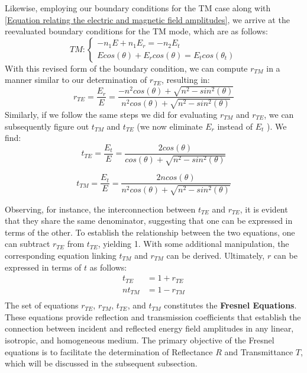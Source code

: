 Likewise, employing our boundary conditions for the TM case along with \ref{Equation relating the electric and magnetic field amplitudes}, we arrive at the reevaluated boundary conditions for the TM mode, which are as follows:
\begin{equation}
TM:
\begin{cases} \label{TM boundary conditions}
  -n_1E + n_1E_r = -n_2E_t \\
  Ecos(\theta) + E_rcos(\theta) = E_tcos(\theta_t)
\end{cases}
\end{equation}
With this revised form of the boundary condition, we can compute $r_{TM}$ in a manner similar to our determination of $r_{TE}$, resulting in:
\begin{equation} \label{Reflection coefficient (TM) without \theta_t}
r_{TE} = \frac{E_r}{E} = \frac{-n^2cos(\theta) + \sqrt{n^2 - sin^2(\theta)}}{n^2cos(\theta) + \sqrt{n^2 - sin^2(\theta)}}
\end{equation}
Similarly, if we follow the same steps we did for evaluating $r_{TM}$ and $r_{TE}$, we can subsequently figure out $t_{TM}$ and $t_{TE}$ (we now eliminate $E_r$ instead of $E_t$ ). We find:
\begin{equation} \label{Reflection coefficient (TM) without \theta_t}
t_{TE} = \frac{E_t}{E} = \frac{2cos(\theta)}{cos(\theta) + \sqrt{n^2 - sin^2(\theta)}}
\end{equation}

\begin{equation} \label{Reflection coefficient (TM) without \theta_t}
t_{TM} = \frac{E_t}{E} = \frac{2ncos(\theta)}{n^2cos(\theta) + \sqrt{n^2 - sin^2(\theta)}}
\end{equation}

Observing, for instance, the interconnection between $t_{TE}$ and $r_{TE}$, it is evident that they share the same denominator, suggesting that one can be expressed in terms of the other. To establish the relationship between the two equations, one can subtract $r_{TE}$ from $t_{TE}$, yielding 1. With some additional manipulation, the corresponding equation linking $t_{TM}$ and $r_{TM}$ can be derived. Ultimately, $r$ can be expressed in terms of $t$ as follows:
\begin{align*}
    t_{TE} &= 1 + r_{TE} \\
    nt_{TM} &= 1 - r_{TM} \\
\end{align*}
The set of equations $r_{TE}$, $r_{TM}$, $t_{TE}$, and $t_{TM}$ constitutes the \textbf{Fresnel Equations}. These equations provide reflection and transmission coefficients that establish the connection between incident and reflected energy field amplitudes in any linear, isotropic, and homogeneous medium. The primary objective of the Fresnel equations is to facilitate the determination of Reflectance $R$ and Transmittance $T$, which will be discussed in the subsequent subsection.

